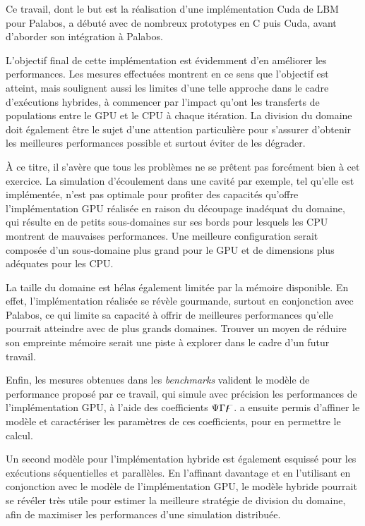 Ce travail, dont le but est la réalisation d'une implémentation Cuda de \acs{LBM} pour Palabos, a débuté avec de nombreux prototypes en C puis  Cuda, avant d'aborder son intégration à Palabos.

L'objectif final de cette implémentation est évidemment d'en améliorer les performances. Les mesures effectuées montrent en ce sens que l'objectif est atteint, mais soulignent aussi les limites d'une telle approche dans le cadre d'exécutions hybrides, à commencer par l'impact qu'ont les transferts de populations entre le \acs{GPU} et le \acs{CPU} à chaque itération. La division du domaine doit également être le sujet d'une attention particulière pour s'assurer d'obtenir les meilleures performances possible et surtout éviter de les dégrader.

À ce titre, il s'avère que tous les problèmes ne se prêtent pas forcément bien à cet exercice. La simulation d'écoulement dans une cavité par exemple, tel qu'elle est implémentée, n'est pas optimale pour profiter des capacités qu'offre l'implémentation \acs{GPU} réalisée en raison du découpage inadéquat du domaine, qui résulte en de petits sous-domaines sur ses bords pour lesquels les \acs{CPU} montrent de mauvaises performances. Une meilleure configuration serait composée d'un sous-domaine plus grand pour le \acs{GPU} et de dimensions plus adéquates pour les \acs{CPU}.

La taille du domaine est hélas également limitée par la mémoire disponible. En effet, l'implémentation réalisée se révèle gourmande, surtout en conjonction avec Palabos, ce qui limite sa capacité à offrir de meilleures performances qu'elle pourrait atteindre avec de plus grands domaines. Trouver un moyen de réduire son empreinte mémoire serait une piste à explorer dans le cadre d'un futur travail.

Enfin, les mesures obtenues dans les \textit{benchmarks} valident le modèle de performance proposé par ce travail, qui simule avec précision les performances de l'implémentation \acs{GPU}, à l'aide des coefficients $\Psi\Gamma\digamma$. \cite{albuquerque_performance_2012} a ensuite permis d'affiner le modèle et caractériser les paramètres de ces coefficients, pour en permettre le calcul. 

Un second modèle pour l'implémentation hybride est également esquissé pour les exécutions séquentielles et parallèles. En l'affinant davantage et en l'utilisant en conjonction avec le modèle de l'implémentation \acs{GPU}, le modèle hybride pourrait se révéler très utile pour estimer la meilleure stratégie de division du domaine, afin de maximiser les performances d'une simulation distribuée.